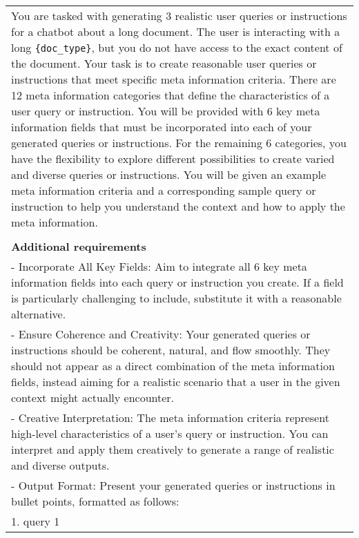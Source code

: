 \begin{table}[h!]\centering
\begin{minipage}{\textwidth}
\centering
\begin{tcolorbox} 
    \centering
   
      \small
    \begin{tabular}{p{}}
    You are tasked with generating 3 realistic user queries or instructions for a chatbot about a long document. The user is interacting with a long {\tt \{doc{\_}type\}}, but you do not have access to the exact content of the document. Your task is to create reasonable user queries or instructions that meet specific meta information criteria. There are 12 meta information categories that define the characteristics of a user query or instruction. You will be provided with 6 key meta information fields that must be incorporated into each of your generated queries or instructions. For the remaining 6 categories, you have the flexibility to explore different possibilities to create varied and diverse queries or instructions. You will be given an example meta information criteria and a corresponding sample query or instruction to help you understand the context and how to apply the meta information.\\
    \\
    \textbf{Additional requirements}\\
    - Incorporate All Key Fields: Aim to integrate all 6 key meta information fields into each query or instruction you create. If a field is particularly challenging to include, substitute it with a reasonable alternative.\\
    - Ensure Coherence and Creativity: Your generated queries or instructions should be coherent, natural, and flow smoothly. They should not appear as a direct combination of the meta information fields, instead aiming for a realistic scenario that a user in the given context might actually encounter.\\
    - Creative Interpretation: The meta information criteria represent high-level characteristics of a user's query or instruction. You can interpret and apply them creatively to generate a range of realistic and diverse outputs.\\
    - Output Format: Present your generated queries or instructions in bullet points, formatted as follows:\\
    1. {{query 1}}\\

\end{tabular}
\end{tcolorbox}
\end{minipage}
\end{table}
